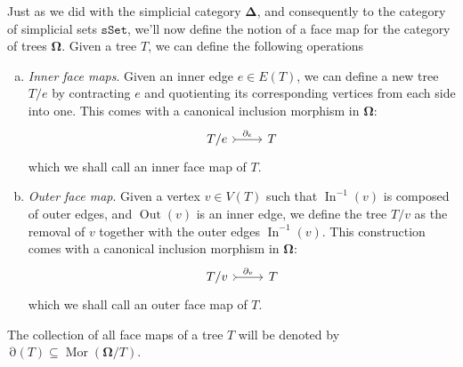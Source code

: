 \documentclass[11pt, reqno]{amsart}
\theoremstyle{definition}
\newcommand{\catfont}{\texttt}
\DeclareMathOperator{\Mor}{Mor}   %
\newcommand{\Splx}{{\mathbf{\Delta}}}           %
\newcommand{\sSet}{{\catfont{sSet}}}            %
\newcommand{\Tree}{{\mathbf{\Omega}}}
\DeclareMathOperator{\Input}{In}
\DeclareMathOperator{\Output}{Out}
\DeclareMathOperator{\TreeFace}{\partial}
\begin{document}
Just as we did with the simplicial category \(\Splx\), and consequently to the
category of simplicial sets \(\sSet\), we'll now define the notion of a face
map for the category of trees \(\Tree\). Given a tree \(T\), we can define the following operations 
\begin{enumerate}[(a)]\setlength\itemsep{0em}
    \item \emph{Inner face maps}. Given an inner edge \(e \in E(T)\), we can
        define a new tree \(T/e\) by contracting \(e\) and quotienting its
        corresponding vertices from each side into one. This comes with a
        canonical inclusion morphism in \(\Tree\):
        \[
            \begin{tikzcd}
                T/e \ar[r, "\TreeFace_e", tail] &T
            \end{tikzcd}
        \]
        which we shall call an inner face map of \(T\).
    \item \emph{Outer face map}. Given a vertex \(v \in V(T)\) such that
        \(\Input^{-1}(v)\) is composed of outer edges, and \(\Output(v)\) is an
        inner edge, we define the tree \(T/v\) as the removal of \(v\) together
        with the outer edges \(\Input^{-1}(v)\). This construction comes with a
        canonical inclusion morphism in \(\Tree\):
        \[
            \begin{tikzcd}
                T/v \ar[r, "\TreeFace_v", tail] &T
            \end{tikzcd}
        \]
        which we shall call an outer face map of \(T\).
\end{enumerate}
The collection of all face maps of a tree \(T\) will be denoted by
\(\TreeFace(T) \subseteq \Mor(\Tree/T)\).





\printbibliography
\end{document}
